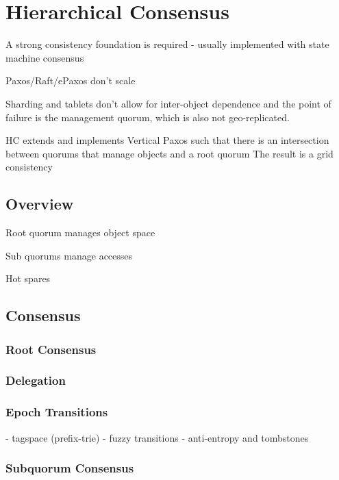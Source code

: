 
\renewcommand{\thechapter}{3}

\chapter{Hierarchical Consensus}

A strong consistency foundation is required - usually implemented with state machine consensus

Paxos/Raft/ePaxos don’t scale

Sharding and tablets don’t allow for inter-object dependence and the point of failure is the management quorum, which is also not geo-replicated.

HC extends and implements Vertical Paxos such that there is an intersection between quorums that manage objects and a root quorum
The result is a grid consistency


\section{Overview}

Root quorum manages object space

Sub quorums manage accesses

Hot spares


\section{Consensus}

\subsection{Root Consensus}

\subsection{Delegation}

\subsection{Epoch Transitions}

- tagspace (prefix-trie)
- fuzzy transitions
- anti-entropy and tombstones

\subsection{Subquorum Consensus}

